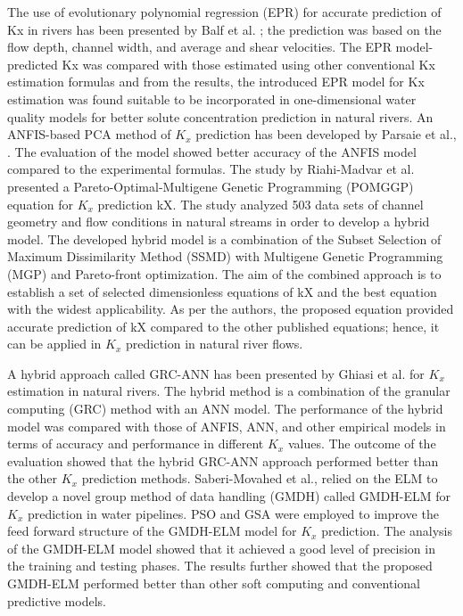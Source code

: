\documentclass[a4paper,12pt, english]{article}
\begin{document}
The use of evolutionary polynomial regression (EPR) for accurate prediction of Kx  in rivers has been presented by Balf et al. \cite{balf2018evolutionary}; the prediction was based on the flow depth, channel width, and average and shear velocities. The EPR model-predicted Kx was compared with those estimated using other conventional Kx  estimation formulas and from the results, the introduced EPR model for Kx estimation was found suitable to be incorporated in one-dimensional water quality models for better solute concentration prediction in natural rivers. An ANFIS-based PCA method of $K_x$ prediction has been developed by Parsaie et al.,\cite{parsaie2018anfis} . The evaluation of the model showed better accuracy of the ANFIS model compared to the experimental formulas. The study by Riahi-Madvar et al. \cite{riahi2019pareto}
 presented a Pareto-Optimal-Multigene Genetic Programming (POMGGP) equation for $K_x$ prediction kX. The study analyzed 503 data sets of channel geometry and flow conditions in natural streams in order to develop a hybrid model. The developed hybrid model is a combination of the Subset Selection of Maximum Dissimilarity Method (SSMD) with Multigene Genetic Programming (MGP) and Pareto-front optimization. The aim of the combined approach is to establish a set of selected dimensionless equations of kX and the best equation with the widest applicability. As per the authors, the proposed equation provided accurate prediction of kX compared to the other published equations; hence, it can be applied in $K_x$ prediction in natural river flows.

A hybrid approach called GRC-ANN has been presented by Ghiasi et al. \cite{ghiasi2019granular} for $K_x$ estimation in natural rivers. The hybrid method is a combination of the granular computing (GRC) method with an ANN model. The performance of the hybrid model was compared with those of ANFIS, ANN, and other empirical models in terms of accuracy and performance in different $K_x$ values. The outcome of the evaluation showed that the hybrid GRC-ANN approach performed better than the other $K_x$ prediction methods. Saberi-Movahed et al., \cite{saberi2020receiving} relied on the ELM to develop a novel group method of data handling (GMDH) called GMDH-ELM for $K_x$ prediction in water pipelines. PSO and GSA were employed to improve the feed forward structure of the GMDH-ELM model for $K_x$ prediction. The analysis of the GMDH-ELM model showed that it achieved a good level of precision in the training and testing phases. The results further showed that the proposed GMDH-ELM performed better than other soft computing and conventional predictive models.
\end{document}
